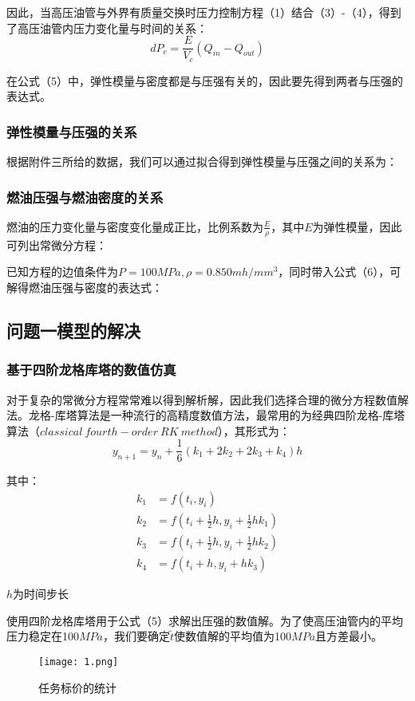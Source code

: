 \documentclass[withoutpreface,bwprint]{cumcmthesis} %
\begin{document}
因此，当高压油管与外界有质量交换时压力控制方程（1）结合（3）-（4），得到了高压油管内压力变化量与时间的关系：
\begin{equation}
	dP_c = \frac{E}{V_c}(Q_{in} - Q_{out})
\end{equation}

在公式（5）中，弹性模量与密度都是与压强有关的，因此要先得到两者与压强的表达式。
\subsubsection{弹性模量与压强的关系}
根据附件三所给的数据，我们可以通过拟合得到弹性模量与压强之间的关系为：

\subsubsection{燃油压强与燃油密度的关系}
燃油的压力变化量与密度变化量成正比，比例系数为$\frac{E}{\rho}$，其中$E$为弹性模量，因此可列出常微分方程：

已知方程的边值条件为$P = 100MPa, \rho = 0.850 mh/mm^3$，同时带入公式（6），可解得燃油压强与密度的表达式：
\subsection{问题一模型的解决}
\subsubsection{基于四阶龙格库塔的数值仿真}
对于复杂的常微分方程常常难以得到解析解，因此我们选择合理的微分方程数值解法。龙格-库塔算法是一种流行的高精度数值方法，最常用的为经典四阶龙格-库塔算法（$classical\ fourth-order\ RK\ method$），其形式为：
\[
y_{n+1}=y_{n}+\frac{1}{6}(k_{1}+2k_{2}+2k_{3}+k_{4})h
\]

其中：
\begin{align*}
k_{1}&=f(t_{i},y_{i})\\
k_{2}&=f(t_{i}+\frac{1}{2}h,y_{i}+\frac{1}{2}hk_{1})\\
k_{3}&=f(t_{i}+\frac{1}{2}h,y_{i}+\frac{1}{2}hk_{2})\\
k_{4}&=f(t_{i}+h,y_{i}+hk_{3})
\end{align*}

$h$为时间步长

使用四阶龙格库塔用于公式（5）求解出压强的数值解。为了使高压油管内的平均压力稳定在100$MPa$，我们要确定$\widetilde{t}$使数值解的平均值为100$MPa$且方差最小。
\begin{figure}[!h]
	\centering
	\texttt{[image: 1.png]}
	\caption{任务标价的统计}
\end{figure}
\end{document}
